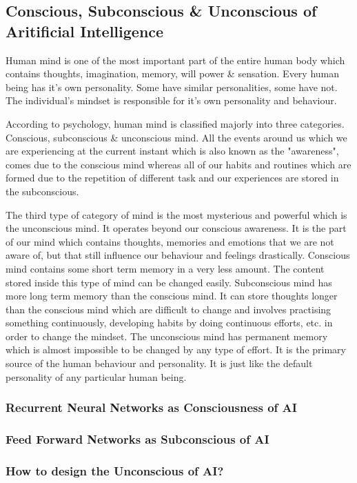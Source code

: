 \subsection{Conscious, Subconscious \& Unconscious of Aritificial Intelligence}
Human mind is one of the most important part of the entire human body which contains thoughts, imagination, memory, will power \& sensation. Every human being has it's own personality. Some have similar personalities, some have not. The individual's mindset is responsible for it's own personality and behaviour.

According to psychology, human mind is classified majorly into three categories. Conscious, subconscious \& unconscious mind. All the events around us which we are experiencing at the current instant which is also known as the "awareness", comes due to the conscious mind whereas all of our habits and routines which are formed due to the repetition of different task and our experiences are stored in the subconscious. 

The third type of category of mind is the most mysterious and powerful which is the unconscious mind. It operates beyond our conscious awareness. It is the part of our mind which contains thoughts, memories and emotions that we are not aware of, but that still influence our behaviour and feelings drastically. Conscious mind contains some short term memory in a very less amount. The content stored inside this type of mind can be changed easily. Subconscious mind has more long term memory than the conscious mind. It can store thoughts longer than the conscious mind which are difficult to change and involves practising something continuously, developing habits by doing continuous efforts, etc. in order to change the mindset. The unconscious mind has permanent memory which is almost impossible to be changed by any type of effort. It is the primary source of the human behaviour and personality. It is just like the default personality of any particular human being\cite{article}.
\subsubsection{Recurrent Neural Networks as Consciousness of AI}
\subsubsection{Feed Forward Networks as Subconscious of AI}
\subsubsection{How to design the Unconscious of AI?}
\cite{article}
